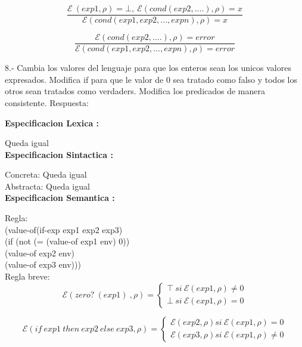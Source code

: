 \documentclass{article}
\begin{document}
$$
\frac{\mathcal{E} \: (exp1,\rho)=\bot, \: \mathcal{E} (cond(exp2,....),\rho)=x }{\mathcal{E}(cond(exp1,exp2,...,expn),\rho)=x}
$$

$$
\frac{\mathcal{E} (cond(exp2,....),\rho)=error }{\mathcal{E}(cond(exp1,exp2,...,expn),\rho)=error}
$$

8.- Cambia los valores del lenguaje para que los enteros sean los unicos valores expresados. Modifica if para que le valor de 0 sea tratado como falso y todos los otros sean tratados como verdaders. Modifica los predicados de manera consistente.\newline
Respuesta: \newline

\textbf{Especificacion Lexica :} \newline

Queda igual\\

\textbf{Especificacion Sintactica :} \newline

Concreta: Queda igual\\

Abstracta: Queda igual\\

\textbf{Especificacion Semantica :} \newline

Regla:\\

(value-of(if-exp exp1 exp2 exp3) \\
 (if (not (= (value-of exp1 env) 0)) \\
     (value-of exp2 env) \\
     (value-of exp3 env))) \\

Regla breve: \\

$$
\mathcal{E}(zero? \: (exp1) \: ,\rho) =
\begin{cases}
    \top \: si \: \mathcal{E}(exp1, \rho) \not = 0 \\
    \bot \: si \: \mathcal{E}(exp1, \rho)  = 0 
\end{cases}
$$

$$
\mathcal{E}(if \: exp1 \: then \: exp2 \: else \: exp3,\rho) =
\begin{cases}
    \mathcal{E}(exp2,\rho) si \: \mathcal{E}(exp1, \rho) = 0 \\
    \mathcal{E}(exp3,\rho) si \: \mathcal{E}(exp1, \rho) \not = 0 
\end{cases}
$$
\end{document}
